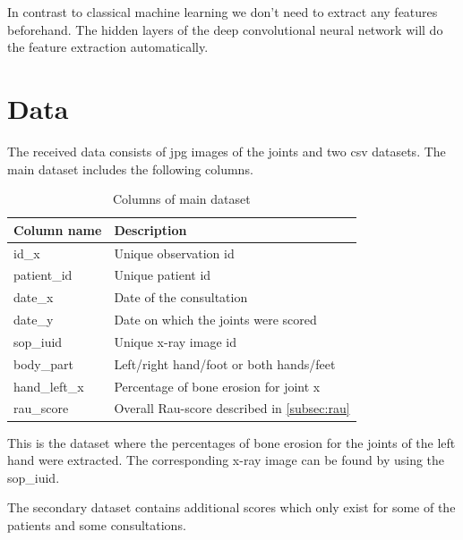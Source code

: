 \documentclass[12pt]{article}
\begin{document}
In contrast to classical machine learning we don't need to extract any features beforehand. The hidden layers of the deep convolutional neural network will do the feature extraction automatically.

\newpage
\section{Data}
\label{sec:data}

The received data consists of jpg images of the joints and two csv datasets. The main dataset includes the following columns.

\begin{table}[ht]
\centering
\caption{Columns of main dataset}
\label{tab:main_dataset}
\begin{tabular}{@{}ll@{}}
\toprule
Column name   & Description                                           \\ \midrule
id\_x         & Unique observation id                                 \\
patient\_id   & Unique patient id                                     \\
date\_x       & Date of the consultation                              \\
date\_y       & Date on which the joints were scored                  \\
sop\_iuid     & Unique x-ray image id                                 \\
body\_part    & Left/right hand/foot or both hands/feet               \\
hand\_left\_x & Percentage of bone erosion for joint x                \\
rau\_score    & Overall Rau-score described in \autoref{subsec:rau} \\ \bottomrule
\end{tabular}
\end{table}

This is the dataset where the percentages of bone erosion for the joints of the left hand were extracted. The corresponding x-ray image can be found by using the sop\_iuid.

The secondary dataset contains additional scores which only exist for some of the patients and some consultations.
\end{document}
